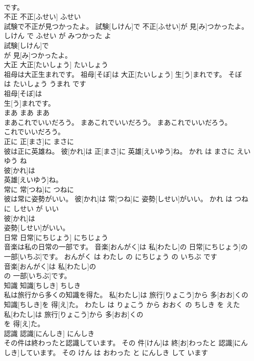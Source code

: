 \documentclass[8pt]{extreport}
\begin{document}
\begin{CJK}{UTF8}{min}
\\	です。			
\\	不正	不正[ふせい]	ふせい	
\\	試験で不正が見つかったよ。	試験[しけん]で 不正[ふせい]が 見[み]つかったよ。	しけん で ふせい が みつかった よ	
\\	試験[しけん]で
\\	が 見[み]つかったよ。			
\\	大正	大正[たいしょう]	たいしょう	
\\	祖母は大正生まれです。	祖母[そぼ]は 大正[たいしょう] 生[う]まれです。	そぼ は たいしょう うまれ です	
\\	祖母[そぼ]は
\\	生[う]まれです。			
\\	まあ	まあ	まあ	
\\	まあこれでいいだろう。	まあこれでいいだろう。	まあこれでいいだろう。	
\\	これでいいだろう。			
\\	正に	正[まさ]に	まさに	
\\	彼は正に英雄ね。	彼[かれ]は 正[まさ]に 英雄[えいゆう]ね。	かれ は まさに えいゆう ね	
\\	彼[かれ]は
\\	英雄[えいゆう]ね。			
\\	常に	常[つね]に	つねに	
\\	彼は常に姿勢がいい。	彼[かれ]は 常[つね]に 姿勢[しせい]がいい。	かれ は つねに しせい が いい	
\\	彼[かれ]は
\\	姿勢[しせい]がいい。			
\\	日常	日常[にちじょう]	にちじょう	
\\	音楽は私の日常の一部です。	音楽[おんがく]は 私[わたし]の 日常[にちじょう]の 一部[いちぶ]です。	おんがく は わたし の にちじょう の いちぶ です	
\\	音楽[おんがく]は 私[わたし]の
\\	の 一部[いちぶ]です。			
\\	知識	知識[ちしき]	ちしき	
\\	私は旅行から多くの知識を得た。	私[わたし]は 旅行[りょこう]から 多[おお]くの 知識[ちしき]を 得[え]た。	わたし は りょこう から おおく の ちしき を えた	
\\	私[わたし]は 旅行[りょこう]から 多[おお]くの
\\	を 得[え]た。			
\\	認識	認識[にんしき]	にんしき	
\\	その件は終わったと認識しています。	その 件[けん]は 終[お]わったと 認識[にんしき]しています。	その けん は おわった と にんしき して います	

\end{CJK}
\end{document}

